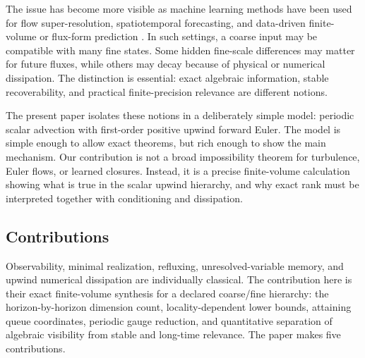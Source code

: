 \documentclass[pdflatex,sn-mathphys-num]{sn-jnl}%
\theoremstyle{thmstyleone}%
\theoremstyle{thmstyletwo}%
\theoremstyle{thmstylethree}%
\begin{document}
The issue has become more visible as machine learning methods have been used
for flow super-resolution, spatiotemporal forecasting, and data-driven
finite-volume or flux-form prediction
\cite{DuraisamyIaccarinoXiao:2019data,KarniadakisEtAl:2021piml,
VinuesaBrunton:2022cfdml,BarSinai:2019datadriven,KochkovEtAl:2021mlcfd,
ZhuangEtAl:2021learnedadvection,deRomemontEtAl:2026learnedfv,
Gao:2021physicsinformed,Gao:2023bayesian,
Sofos:2025spatiotemporal,
Liu:2026entropyCFN,Charles:2025dspweno}.  In such settings, a coarse input
may be compatible with many fine states.  Some hidden fine-scale differences
may matter for future fluxes, while others may decay because of physical or
numerical dissipation.  The distinction is essential: exact algebraic
information, stable recoverability, and practical finite-precision relevance
are different notions.

The present paper isolates these notions in a deliberately simple model:
periodic scalar advection with first-order positive upwind forward Euler.
The model is simple enough to allow exact theorems, but rich enough to show
the main mechanism.  Our contribution is not a broad impossibility theorem
for turbulence, Euler flows, or learned closures.  Instead, it is a precise
finite-volume calculation showing what is true in the scalar upwind
hierarchy, and why exact rank must be interpreted together with conditioning
and dissipation.

\subsection{Contributions}

Observability, minimal realization, refluxing, unresolved-variable memory,
and upwind numerical dissipation are individually classical.  The
contribution here is their exact finite-volume synthesis for a declared
coarse/fine hierarchy: the horizon-by-horizon dimension count,
locality-dependent lower bounds, attaining queue coordinates, periodic gauge
reduction, and quantitative separation of algebraic visibility from stable
and long-time relevance. The paper makes five contributions.
\end{document}

